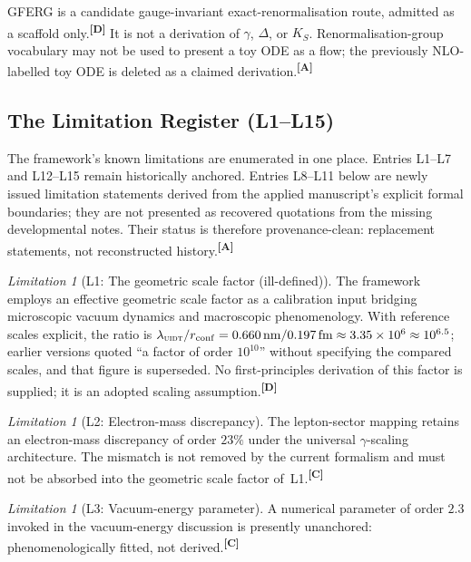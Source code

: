 \documentclass[12pt,a4paper,twoside]{article}
\theoremstyle{plain}
\theoremstyle{definition}
\theoremstyle{remark}
\newtheorem{limitation}[theorem]{Limitation}
\newcommand{\UIDT}{\textsc{uidt}} %
\newcommand{\catmark}[1]{\textsuperscript{\textsf{\textbf{[#1]}}}}
\begin{document}
\begin{governancebox}
GFERG is a candidate gauge-invariant exact-renormalisation route,
admitted as a scaffold only.\catmark{D} It is not a derivation of
$\gamma$, $\Delta$, or $K_S$. Renormalisation-group vocabulary may not
be used to present a toy ODE as a flow; the previously NLO-labelled toy
ODE is deleted as a claimed derivation.\catmark{A}
\end{governancebox}

\subsection{The Limitation Register (L1--L15)}
\label{subsec:limitation-register}

The framework's known limitations are enumerated in one place. Entries
L1--L7 and L12--L15 remain historically anchored. Entries L8--L11 below
are newly issued limitation statements derived from the applied
manuscript's explicit formal boundaries; they are not presented as
recovered quotations from the missing developmental notes. Their status
is therefore provenance-clean: replacement statements, not reconstructed
history.\catmark{A}

\begin{limitation}[L1: The geometric scale factor (ill-defined)]
\label{lim:L1}
The framework employs an effective geometric scale factor as a
calibration input bridging microscopic vacuum dynamics and macroscopic
phenomenology. With reference scales explicit, the ratio is
$\lambda_{\UIDT}/r_{\mathrm{conf}} =
0.660\,\mathrm{nm}/0.197\,\mathrm{fm} \approx 3.35\times10^{6} \approx
10^{6.5}$; earlier versions quoted ``a factor of order $10^{10}$''
without specifying the compared scales, and that figure is superseded.
No first-principles derivation of this factor is supplied; it is an
adopted scaling assumption.\catmark{D}
\end{limitation}

\begin{limitation}[L2: Electron-mass discrepancy]
\label{lim:L2}
The lepton-sector mapping retains an electron-mass discrepancy of order
$23\%$ under the universal $\gamma$-scaling architecture. The mismatch
is not removed by the current formalism and must not be absorbed into
the geometric scale factor of~L1.\catmark{C}
\end{limitation}

\begin{limitation}[L3: Vacuum-energy parameter]
\label{lim:L3}
A numerical parameter of order $2.3$ invoked in the vacuum-energy
discussion is presently unanchored: phenomenologically fitted, not
derived.\catmark{C}
\end{limitation}
\end{document}
